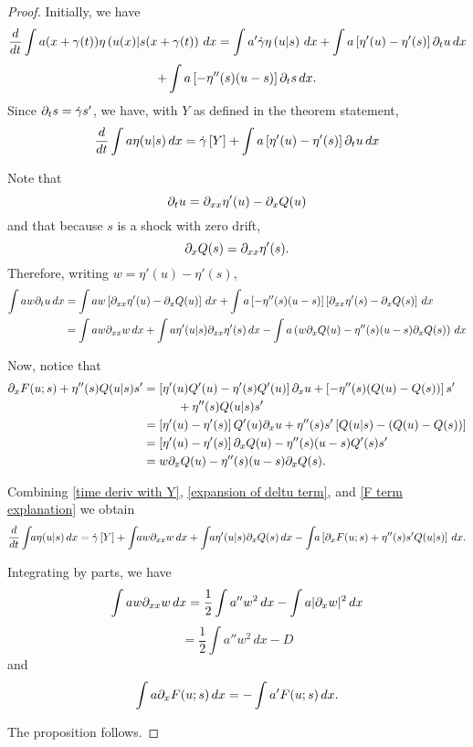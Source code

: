 \begin{proof}
Initially, we have
\[ \frac{d}{dt} \int a(x+\gamma(t)) \eta\left(u(x)|s(x+\gamma(t)\right) \,dx = \int a'\dot{\gamma} \eta\left(u|s\right) \,dx + \int a \left[ \eta'(u) - \eta'(s) \right] \partial_t u \,dx \]
\[ + \int a \left[ -\eta''(s) (u-s) \right] \partial_t s \,dx. \]
Since $\partial_t s = \dot{\gamma} s'$, we have, with $Y$ as defined in the theorem statement, 
\begin{equation} \label{time deriv with Y}
\frac{d}{dt} \int a \eta(u|s) \,dx = \dot{\gamma} \left[ Y \right] + \int a \left[ \eta'(u) - \eta'(s) \right] \partial_t u \,dx 
\end{equation}

Note that
\[ \partial_t u = \partial_{xx} \eta'(u) - \partial_x Q(u) \]
and that because $s$ is a shock with zero drift,
\[ \partial_x Q(s) = \partial_{xx} \eta'(s). \]
Therefore, writing $w = \eta'(u)-\eta'(s)$, 
\begin{equation}\begin{aligned} \label{expansion of deltu term}
\int a w \partial_t u \,dx &= \int a w \left[  \partial_{xx} \eta'(u) - \partial_x Q(u)  \right] \,dx + \int a \left[  -\eta''(s) (u-s)  \right] \left[ \partial_{xx} \eta'(s) - \partial_x Q(s) \right] \,dx
\\ &= \int a w \partial_{xx} w \,dx + \int a \eta'(u|s) \partial_{xx} \eta'(s) \,dx - \int a \left( w \partial_x Q(u) - \eta''(s) (u-s) \partial_x Q(s) \right) \,dx
\end{aligned}\end{equation}

Now, notice that
\begin{equation}\begin{aligned} \label{F term explanation}
\partial_x F(u;s) + \eta''(s)Q(u|s)s' &= \left[  \eta'(u) Q'(u) - \eta'(s)Q'(u)  \right] \partial_x u + \left[  -\eta''(s)(Q(u)-Q(s))  \right] s' \\ & \hspace{1cm} + \eta''(s) Q(u|s) s'
\\ &= \left[  \eta'(u) - \eta'(s)  \right] Q'(u) \partial_x u + \eta''(s)s' \left[  Q(u|s) - \left( Q(u)-Q(s) \right)  \right]
\\ &= \left[  \eta'(u) - \eta'(s)  \right] \partial_x Q(u) - \eta''(s) (u-s) Q'(s) s'
\\ &= w \partial_x Q(u) - \eta''(s) (u-s) \partial_x Q(s).
\end{aligned}\end{equation}

Combining \eqref{time deriv with Y}, \eqref{expansion of deltu term}, and \eqref{F term explanation} we obtain
\[ \ddt \int\!\! a \eta(u|s) \,dx = \dot{\gamma}\bracket{Y}
+ \int\!\! a w \del_{xx} w \,dx 
+ \int\!\! a \eta'(u|s) \del_x Q(s) \,dx
- \int\!\! a \left[ \del_x F(u;s) + \eta''(s)s'Q(u|s) \right] \,dx. \]

Integrating by parts, we have
\[ \int a w \partial_{xx} w \,dx = \frac{1}{2} \int a'' w^2 \,dx - \int a |\partial_x w|^2 \,dx \]
\[ = \frac{1}{2} \int a'' w^2 \,dx - D \]
and
\[ \int a \partial_x F(u;s) \,dx = - \int a' F(u;s) \,dx. \]

The proposition follows.  

\end{proof}

